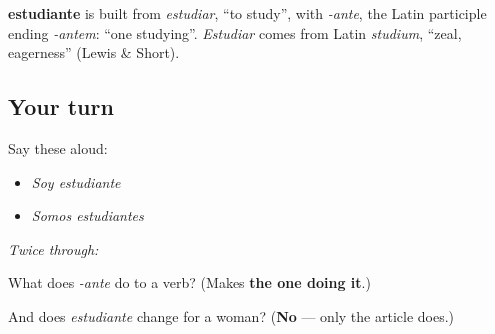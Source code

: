 \begin{cousinweb}
\textbf{estudiante} is built from \emph{estudiar}, \textquotedblleft{}to study\textquotedblright{}, with \emph{-ante}, the Latin participle ending \emph{-antem}: \textquotedblleft{}one studying\textquotedblright{}. \emph{Estudiar} comes from Latin \emph{studium}, \textquotedblleft{}zeal, eagerness\textquotedblright{} (Lewis \& Short).
\end{cousinweb}

\subsection*{Your turn}
Say these aloud:

\begin{itemize}
\raggedright
  \item \emph{Soy estudiante}
  \item \emph{Somos estudiantes}
\end{itemize}

\emph{Twice through:}

\begin{tcolorbox}[breakable,colback=teal!4,colframe=teal!35!black,title={Before you move on}]
What does \emph{-ante} do to a verb? (Makes \textbf{the one doing it}.)

And does \emph{estudiante} change for a woman? (\textbf{No} — only the article does.)
\end{tcolorbox}
